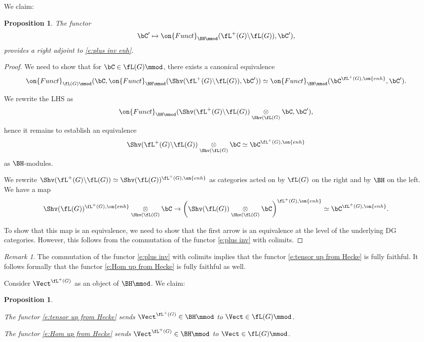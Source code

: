 \documentclass[9pt]{amsart}
\newtheorem{prop}[subsubsection]{Proposition}
\theoremstyle{definition}
\theoremstyle{remark}
\newtheorem{rem}[subsubsection]{Remark}
\numberwithin{equation}{section}
\begin{document}
We claim:

\begin{prop}  \label{p:right adj to Hecke}
The functor 
\begin{equation} \label{e:Hom up from Hecke}
\bC'\mapsto \on{Funct}_{\BH\mmod}(\fL^+(G)\backslash\fL(G)),\bC'),
\end{equation}
provides a right adjoint to \eqref{e:plus inv enh}.
\end{prop}

\begin{proof}

We need to show that for $\bC\in \fL(G)\mmod$, there exists a canonical equivalence
$$\on{Funct}_{\fL(G)\mmod}(\bC,\on{Funct}_{\BH\mmod}(\Shv(\fL^+(G)\backslash\fL(G)),\bC')) \simeq
\on{Funct}_{\BH\mmod}(\bC^{\fL^+(G),\on{enh}},\bC').$$

We rewrite the LHS as
$$\on{Funct}_{\BH\mmod}(\Shv(\fL^+(G)\backslash\fL(G)) \underset{\Shv(\fL(G)}\otimes \bC,\bC'),$$
hence it remains to establish an equivalence
$$\Shv(\fL^+(G)\backslash\fL(G)) \underset{\Shv(\fL(G)}\otimes \bC\simeq \bC^{\fL^+(G),\on{enh}}$$
as $\BH$-modules.

\medskip

We rewrite $\Shv(\fL^+(G)\backslash \fL(G))\simeq \Shv(\fL(G))^{\fL^+(G),\on{enh}}$ as categories acted on by $\fL(G)$ on the right and by $\BH$
on the left. We have a map 
$$\Shv(\fL(G))^{\fL^+(G),\on{enh}} \underset{\Shv(\fL(G)}\otimes \bC \to 
\left(\Shv(\fL(G))\underset{\Shv(\fL(G)}\otimes \bC\right)^{\fL^+(G),\on{enh}} \simeq  \bC^{\fL^+(G),\on{enh}}.$$

To show that this map is an equivalence, we need to show that the first arrow is an equivalence at the level
of the underlying DG categories. However, this follows from the commutation of the functor \eqref{e:plus inv}
with colimits.

\end{proof} 

\begin{rem}
The commutation of the functor \eqref{e:plus inv} with colimits implies that the functor \eqref{e:tensor up from Hecke}
is fully faithful. It follows formally that the functor \eqref{e:Hom up from Hecke} is fully faithful as well.
\end{rem}

\sssec{}

Consider $\Vect^{\fL^+(G)}$ as an object of $\BH\mmod$. We claim:

\begin{prop} \hfill  \label{p:recover Vect}

\smallskip

The functor \eqref{e:tensor up from Hecke} sends $\Vect^{\fL^+(G)}\in \BH\mmod$ to $\Vect\in \fL(G)\mmod$.

\smallskip

The functor \eqref{e:Hom up from Hecke} sends $\Vect^{\fL^+(G)}\in \BH\mmod$ to $\Vect\in \fL(G)\mmod$.

\end{prop} 
\end{document}
